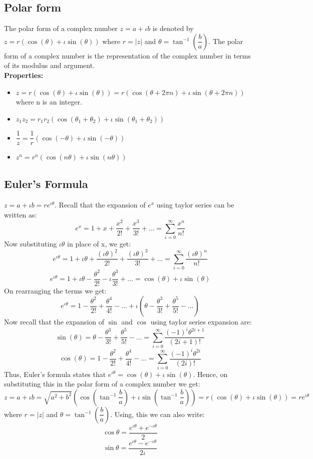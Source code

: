 \subsection{Polar form}
The polar form of a complex number $z=a+\iota b$ is denoted by $z=r(\cos(\theta)+\iota \sin(\theta))$ where $r=|z|$ and $\theta=\tan^{-1}(\dfrac{b}{a})$. The polar form of a complex number is the representation of the complex number in terms of its modulus and argument.\\
\textbf{Properties: }
\begin{itemize}
    \item $z=r(\cos(\theta)+\iota \sin(\theta))=r(\cos(\theta+2\pi n)+\iota \sin(\theta+2\pi n))$ where n is an integer.
    \item $z_1z_2=r_1r_2(\cos(\theta_1+\theta_2)+\iota \sin(\theta_1+\theta_2))$
    \item $\dfrac{1}{z}=\dfrac{1}{r}(\cos(-\theta)+\iota \sin(-\theta))$
    \item $z^n=r^n(\cos(n\theta)+\iota \sin(n\theta))$
\end{itemize}

\subsection{Euler's Formula}
$z=a+\iota b=re^{\iota \theta}$. Recall that the expansion of $e^x$ using taylor series can be written as:
\[ e^x=1+x+\dfrac{x^2}{2!}+\dfrac{x^3}{3!}+\ldots = \sum_{i=0}^{\infty} \dfrac{x^n}{n!}\]
Now substituting $\iota \theta$ in place of x, we get:
\[ e^{\iota \theta}=1+\iota \theta+\dfrac{(\iota \theta)^2}{2!}+\dfrac{(\iota \theta)^3}{3!}+\ldots = \sum_{i=0}^{\infty} \dfrac{(\iota \theta)^n}{n!}\]
\[ e^{\iota \theta}=1+\iota \theta-\dfrac{\theta^2}{2!}-\iota \dfrac{\theta^3}{3!}+\ldots = \cos(\theta)+\iota \sin(\theta) \]
On rearranging the terms we get:
\[ e^{\iota \theta}= 1-\dfrac{\theta^2}{2!} + \dfrac{\theta^4}{4!} - \ldots + \iota(\theta-\dfrac{\theta^3}{3!}+\dfrac{\theta^5}{5!}-\ldots) \]
Now recall that the expansion of $\sin$ and $\cos$ using taylor series expansion are:
\[ \sin(\theta)=\theta-\dfrac{\theta^3}{3!}+\dfrac{\theta^5}{5!}-\ldots = \sum_{i=0}^{\infty} \dfrac{(-1)^i\theta^{2i+1}}{(2i+1)!} \]
\[ \cos(\theta)=1-\dfrac{\theta^2}{2!}+\dfrac{\theta^4}{4!}-\ldots = \sum_{i=0}^{\infty} \dfrac{(-1)^i\theta^{2i}}{(2i)!} \]
Thus, Euler's formula states that $e^{\iota \theta}=\cos(\theta)+\iota \sin(\theta)$.
Hence, on substituting this in the polar form of a complex number we get:
\[ z=a+\iota b = \sqrt{a^2 + b^2} (\cos \left(\tan^{-1}\frac{b}{a}\right) + \iota \sin \left(\tan^{-1}\frac{b}{a}\right))=r(\cos(\theta)+\iota \sin(\theta))=re^{\iota \theta} \]
where $r=|z|$ and $\theta=\tan^{-1}(\dfrac{b}{a})$.
Using, this we can also write:
\[ \cos \theta = \frac{e^{\iota \theta}+e^{-\iota \theta}}{2} \] 
\[ \sin \theta = \frac{e^{\iota \theta}-e^{-\iota \theta}}{2\iota} \]






